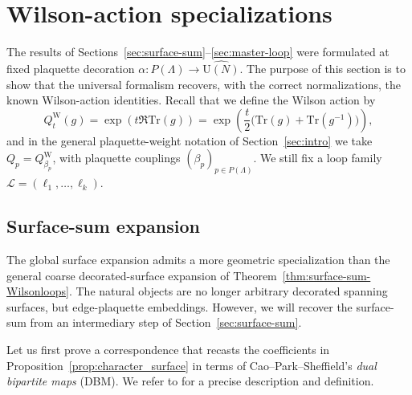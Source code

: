 \documentclass[11pt,a4paper,reqno]{article}
\theoremstyle{definition}
\theoremstyle{remark}
\newcommand\U{{\mathrm U}}
\newcommand\Tr{\mathrm{Tr}}
\newcommand\Lc{{\mathcal{L}}}
\begin{document}
\section{Wilson-action specializations}\label{sec:specializations}

The results of Sections~\ref{sec:surface-sum}--\ref{sec:master-loop} were formulated at fixed plaquette decoration $\alpha : P(\Lambda)\to \widehat{\U(N)}$. The purpose of this section is to show that the universal formalism recovers, with the correct normalizations, the known Wilson-action identities. Recall that we define the Wilson action by
\[
Q_t^{\mathrm W}(g)=\exp(t\Re\Tr(g))= \exp\left(\frac t2\bigl(\Tr(g)+\Tr(g^{-1})\bigr)\right),
\]
and in the general plaquette-weight notation of Section~\ref{sec:intro} we take $Q_p=Q^{\mathrm W}_{\beta_p}$, with plaquette couplings $(\beta_p)_{p\in P(\Lambda)}$. We still fix a loop family $\Lc=(\ell_1,\ldots,\ell_k)$.

\subsection{Surface-sum expansion}

The global surface expansion admits a more geometric specialization than the general coarse decorated-surface expansion of Theorem~\ref{thm:surface-sum-Wilsonloops}. The natural objects are no longer arbitrary decorated spanning surfaces, but edge-plaquette embeddings. However, we will recover the surface-sum from an intermediary step of Section~\ref{sec:surface-sum}.

Let us first prove a correspondence that recasts the coefficients in Proposition~\ref{prop:character_surface} in terms of Cao--Park--Sheffield's \emph{dual bipartite maps} (DBM). We refer to \cite{CPS25} for a precise description and definition.
\end{document}

